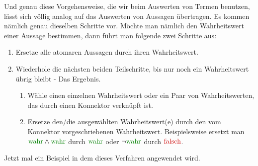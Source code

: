\documentclass[../../main.tex]{subfiles}
\begin{document}
Und genau diese Vorgehensweise, die wir beim Auswerten von Termen benutzen, lässt sich völlig analog auf das Auswerten von Aussagen übertragen. 
Es kommen nämlich genau dieselben Schritte vor. Möchte man nämlich den Wahrheitswert einer Aussage bestimmen, dann führt man folgende zwei Schritte aus:
    \begin{enumerate}
    \item Ersetze alle atomaren Aussagen durch ihren Wahrheitswert.
    \item 
        Wiederhole die nächsten beiden Teilschritte, bis nur noch ein Wahrheitswert übrig bleibt - Das Ergebnis.
        \begin{enumerate}
            \item Wähle einen einzelnen Wahrheitswert oder ein Paar von Wahrheitswerten, das durch einen Konnektor verknüpft ist.
            \item Ersetze den/die ausgewählten Wahrheitswert(e) durch den vom Konnektor vorgeschriebenen Wahrheitswert. Beispielsweise ersetzt man $\wahr \land \wahr$ durch $\wahr$ oder $\neg \wahr$ durch $\falsch$. 
        \end{enumerate}
    \end{enumerate}
    
Jetzt mal ein Beispiel in dem dieses Verfahren angewendet wird.
\end{document}
